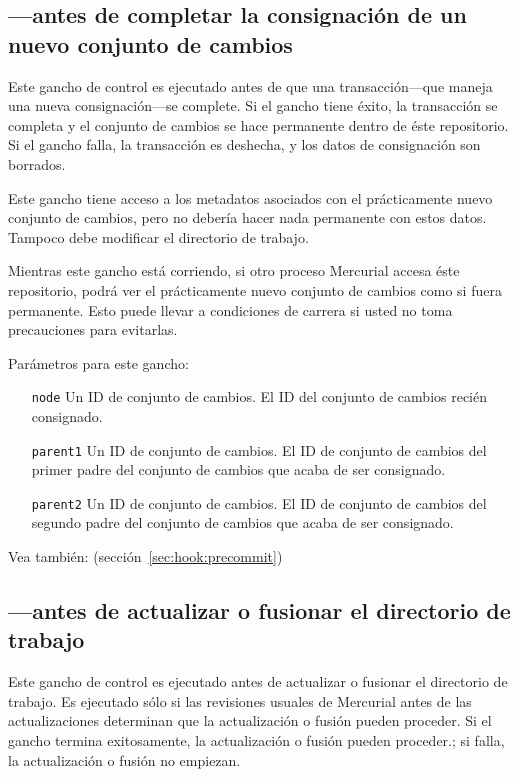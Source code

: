 \subsection{---antes de completar la consignación
de un nuevo conjunto de cambios}
\label{sec:hook:pretxncommit}

Este gancho de control es ejecutado antes de que una transacción---que
maneja una nueva consignación---se complete. Si el gancho tiene éxito,
la transacción se completa y el conjunto de cambios se hace permanente
dentro de éste repositorio. Si el gancho falla, la transacción es
deshecha, y los datos de consignación son borrados.

Este gancho tiene acceso a los metadatos asociados con el
prácticamente nuevo conjunto de cambios, pero no debería hacer nada
permanente con estos datos. Tampoco debe modificar el directorio de
trabajo.

Mientras este gancho está corriendo, si otro proceso Mercurial accesa
éste repositorio, podrá ver el prácticamente nuevo conjunto de cambios
como si fuera permanente. Esto puede llevar a condiciones de carrera si
usted no toma precauciones para evitarlas.

Parámetros para este gancho:
\begin{itemize}
  \item[\texttt{node}] Un ID de conjunto de cambios. El ID del
    conjunto de cambios recién consignado.
\item[\texttt{parent1}] Un ID de conjunto de cambios. El ID de
  conjunto de cambios del primer padre del conjunto de cambios que
  acaba de ser consignado.
\item[\texttt{parent2}] Un ID de conjunto de cambios. El ID de
  conjunto de cambios del segundo padre del conjunto de cambios que
  acaba de ser consignado.
\end{itemize}

Vea también:  (sección~\ref{sec:hook:precommit})

\subsection{---antes de actualizar o fusionar el
directorio de trabajo}
\label{sec:hook:preupdate}

Este gancho de control es ejecutado antes de actualizar o fusionar el
directorio de trabajo. Es ejecutado sólo si las revisiones usuales de
Mercurial antes de las actualizaciones determinan que la actualización
o fusión pueden proceder. Si el gancho termina exitosamente, la
actualización o fusión pueden proceder.; si falla, la actualización o
fusión no empiezan.

